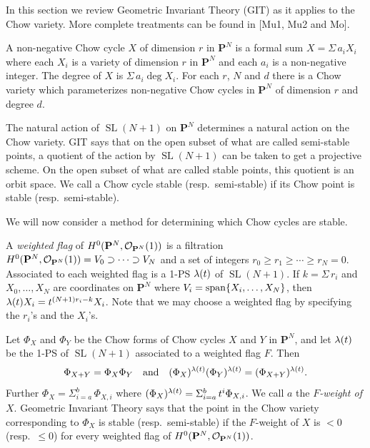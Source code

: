 \documentclass[12pt]{memoir}
\providecommand{\SL}{\operatorname{SL}}
\begin{document}
In this section we review Geometric Invariant Theory (GIT) as it applies to the Chow variety. More complete treatments can be found in [Mu1, Mu2 and Mo].

A non-negative Chow cycle $X$ of dimension $r$ in $\mathbf{P}^N$ is a formal sum $X = \Sigma\, a_i X_i$ where each $X_i$ is a variety of dimension $r$ in $\mathbf{P}^N$ and each $a_i$ is a non-negative integer. The degree of $X$ is $\Sigma\, a_i \deg X_i$. For each $r$, $N$ and $d$ there is a Chow variety which parameterizes non-negative Chow cycles in $\mathbf{P}^N$ of dimension $r$ and degree $d$.

The natural action of $\SL(N+1)$ on $\mathbf{P}^N$ determines a natural action on the Chow variety. GIT says that on the open subset of what are called semi-stable points, a quotient of the action by $\SL(N+1)$ can be taken to get a projective scheme. On the open subset of what are called stable points, this quotient is an orbit space. We call a Chow cycle stable (resp.\ semi-stable) if its Chow point is stable (resp.\ semi-stable).

We will now consider a method for determining which Chow cycles are stable.

A \emph{weighted flag} of $H^0(\mathbf{P}^N, \mathcal{O}_{\mathbf{P}^N}(1))$ is a filtration $H^0(\mathbf{P}^N, \mathcal{O}_{\mathbf{P}^N}(1)) = V_0 \supset \cdots \supset V_N$ and a set of integers $r_0 \geqslant r_1 \geqslant \cdots \geqslant r_N = 0$. Associated to each weighted flag is a 1-PS $\lambda(t)$ of $\SL(N+1)$. If $k = \Sigma\, r_i$ and $X_0, \dots, X_N$ are coordinates on $\mathbf{P}^N$ where $V_i = \operatorname{span}\{X_i, \dots, X_N\}$, then $\lambda(t)X_i = t^{(N+1)r_i - k} X_i$. Note that we may choose a weighted flag by specifying the $r_i$'s and the $X_i$'s.

Let $\Phi_X$ and $\Phi_Y$ be the Chow forms of Chow cycles $X$ and $Y$ in $\mathbf{P}^N$, and let $\lambda(t)$ be the 1-PS of $\SL(N+1)$ associated to a weighted flag $F$. Then
\[
\Phi_{X+Y} = \Phi_X \Phi_Y \quad \text{and} \quad (\Phi_X)^{\lambda(t)} (\Phi_Y)^{\lambda(t)} = (\Phi_{X+Y})^{\lambda(t)}.
\]
Further $\Phi_X = \Sigma_{i=a}^{b}\, \Phi_{X,i}$ where $(\Phi_X)^{\lambda(t)} = \Sigma_{i=a}^{b}\, t^i \Phi_{X,i}$. We call $a$ the \emph{$F$-weight of $X$}. Geometric Invariant Theory says that the point in the Chow variety corresponding to $\Phi_X$ is stable (resp.\ semi-stable) if the $F$-weight of $X$ is ${} < 0$ (resp.\ $\leqslant 0$) for every weighted flag of $H^0(\mathbf{P}^N, \mathcal{O}_{\mathbf{P}^N}(1))$.

\end{document}
